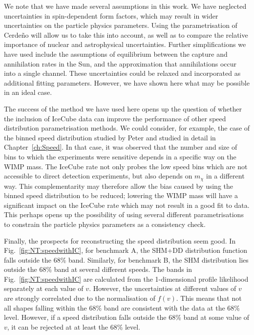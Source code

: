 We note that we have made several assumptions in this work. We have neglected uncertainties in spin-dependent form factors, which may result in wider uncertainties on the particle physics parameters. Using the parametrisation of Cerde\~{n}o \etal \cite{Cerdeno:2012} will allow us to take this into account, as well as to compare the relative importance of nuclear and astrophysical uncertainties. Further simplifications we have used include the assumptions of equilibrium between the capture and annihilation rates in the Sun, and the approximation that annihilations occur into a single channel.  These uncertainties could be relaxed and incorporated as additional fitting parameters. However, we have shown here what may be possible in an ideal case.


The success of the method we have used here opens up the question of whether the inclusion of IceCube data can improve the performance of other speed distribution parametrisation methods. We could consider, for example, the case of the binned speed distribution studied by Peter \cite{Peter:2011} and studied in detail in Chapter~\ref{ch:Speed}. In that case, it was observed that the number and size of bins to which the experiments were sensitive depends in a specific way on the WIMP mass. The IceCube rate not only probes the low speed bins which are not accessible to direct detection experiments, but also depends on $m_\chi$ in a different way. This complementarity may therefore allow the bias caused by using the binned speed distribution to be reduced; lowering the WIMP mass will have a significant impact on the IceCube rate which may not result in a good fit to data. This perhaps opens up the possibility of using several different parametrisations to constrain the particle physics parameters as a consistency check.

Finally, the prospects for reconstructing the speed distribution seem good. In Fig.~\ref{fig:NT:speedwithIC}, for benchmark A, the SHM+DD distribution function falls outside the 68\% band. Similarly, for benchmark B, the SHM distribution lies outside the 68\% band at several different speeds. The bands in Fig.~\ref{fig:NT:speedwithIC} are calculated from the 1-dimensional profile likelihood separately at each value of $v$. However, the uncertainties at different values of $v$ are strongly correlated due to the normalisation of $f(v)$. This means that not all shapes falling within the 68\% band are consistent with the data at the 68\% level. However, if a speed distribution falls outside the 68\% band at some value of $v$, it can be rejected at at least the 68\% level.

